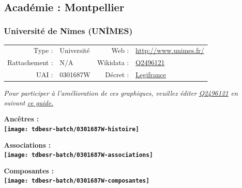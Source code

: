 \documentclass[12pt,french,]{article}
\begin{document}
\ifoddpage \fi ~\newpage  

\hypertarget{acaduxe9mie-montpellier}{%
\subsection{Académie : Montpellier}\label{acaduxe9mie-montpellier}}

\hypertarget{universituxe9-de-nuxeemes-unuxeemes}{%
\subsubsection{Université de Nîmes
(UNÎMES)}\label{universituxe9-de-nuxeemes-unuxeemes}}

\begin{tabular*}{\textwidth}{rp{5cm}rl}  
\hline  
Type : & Université & Web : &\href{http://www.unimes.fr/}{http://www.unimes.fr/} \\  
Rattachement : & N/A & Wikidata : & \href{https://www.wikidata.org/entity/Q2496121}{Q2496121} \\  
UAI : & 0301687W & Décret : & \href{http://www.legifrance.gouv.fr/affichTexte.do;jsessionid=3976DDB631865D070704985BB39F3EC7.tpdjo05v_1?cidTexte=JORFTEXT000025790064&categorieLien=id}{Legifrance} \\  
\hline  
\end{tabular*}

\textit{\scriptsize Pour participer à l'amélioration de ces graphiques, veuillez éditer  \href{https://www.wikidata.org/entity/Q2496121}{Q2496121}  en suivant \href{https://github.com/cpesr/wikidataESR/blob/master/Rmd/wikidataESR.md}{ce guide.}}

\vspace{1cm}  
\begin{minipage}[b]{0.50\textwidth}\begin{center} \bf Ancêtres : \\  
\texttt{[image: tdbesr-batch/0301687W-histoire]} \end{center}\end{minipage}\begin{minipage}[b]{0.50\textwidth}\begin{center} \bf Associations : \\  
\texttt{[image: tdbesr-batch/0301687W-associations]} \end{center}\end{minipage}

\hrulefill

\begin{center} \bf Composantes : \\  
\texttt{[image: tdbesr-batch/0301687W-composantes]} \end{center}
\end{document}
